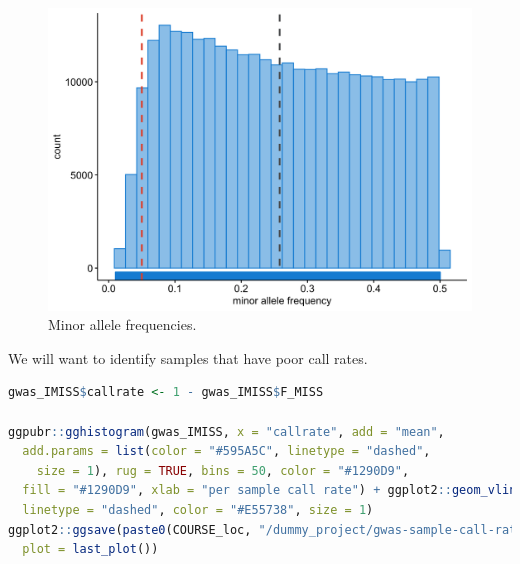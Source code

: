 \documentclass[
]{book}
\begin{document}
\begin{figure}[H]

{\centering \includegraphics[width=18.67in]{img/_gwas_dummy/show-freq-gwas} 

}

\caption{Minor allele frequencies.}\label{fig:show-freq-gwas}
\end{figure}

We will want to identify samples that have poor call rates.

\begin{lstlisting}[language=R]
gwas_IMISS$callrate <- 1 - gwas_IMISS$F_MISS

ggpubr::gghistogram(gwas_IMISS, x = "callrate", add = "mean",
  add.params = list(color = "#595A5C", linetype = "dashed",
    size = 1), rug = TRUE, bins = 50, color = "#1290D9",
  fill = "#1290D9", xlab = "per sample call rate") + ggplot2::geom_vline(xintercept = 0.95,
  linetype = "dashed", color = "#E55738", size = 1)
ggplot2::ggsave(paste0(COURSE_loc, "/dummy_project/gwas-sample-call-rate.png"),
  plot = last_plot())
\end{lstlisting}
\end{document}
